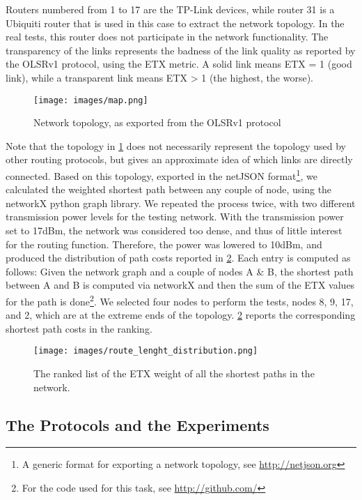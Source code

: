 \documentclass[10pt,onecolumn]{paper}
\begin{document}
Routers numbered from 1 to 17 are the TP-Link devices, while router 31 is a Ubiquiti
router that is used in this case to extract the network topology. In the real
tests, this router does not participate in the network functionality. The
transparency of the links represents the badness of the link quality as reported
by the OLSRv1 protocol, using the ETX metric\cite{ETX}. A solid link means ETX =
1 (good link), while a transparent link means ETX > 1 (the highest, the worse).


\begin{figure}
  \centering
  \texttt{[image: images/map.png]}
  \caption{Network topology, as exported from the OLSRv1 protocol} 
  \label{fig:topo}
\end{figure}%

Note that the topology in \cref{fig:topo} does not necessarily represent the
topology used by other routing protocols, but gives an approximate idea of which
links are directly connected. Based on this topology, exported in the netJSON
format\footnote{A generic format for exporting a network topology, see
\url{http://netjson.org}}, we calculated the weighted shortest path between any couple of node,
using the networkX python graph library. We repeated the process twice, with two different transmission power
levels for the testing network. With the transmission power set to 17dBm, the
network was considered too dense, and thus of little interest for the routing
function. Therefore, the power was lowered to 10dBm, and produced the
distribution of path costs reported in \cref{fig:ETXrank}. Each entry is computed
as follows: Given the network graph and a couple of nodes A & B, the shortest
path between A and B is computed via networkX and then the sum of the ETX values
for the path is done\footnote{For the code used for this task, see
\url{http://github.com/}}. We selected four nodes
to perform the tests, nodes 8, 9, 17, and 2, which are at the extreme ends of the
topology. \cref{fig:ETXrank} reports the corresponding shortest path costs in
the ranking.

\begin{figure}
  \centering
  \texttt{[image: images/route\_lenght\_distribution.png]}
  \caption{The ranked list of the ETX weight of all the shortest paths in the
    network.} 
  \label{fig:ETXrank}
\end{figure}

\subsection{The Protocols and the Experiments}
\end{document}
